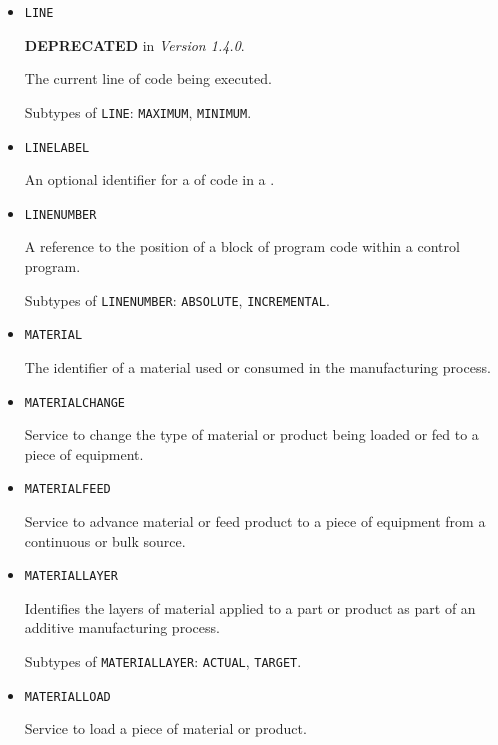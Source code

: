 \begin{itemize}
The software library on a component

Subtypes of \texttt{LIBRARY}: \texttt{VERSION}, \texttt{RELEASE\textunderscore DATE}, \texttt{MANUFACTURER}, \texttt{LICENSE}, \texttt{INSTALL\textunderscore DATE}.

\item \texttt{LINE}  

\textbf{DEPRECATED} in \textit{Version 1.4.0}.

The current line of code being executed.

Subtypes of \texttt{LINE}: \texttt{MAXIMUM}, \texttt{MINIMUM}.

\item \texttt{LINE\textunderscore LABEL}  

An optional identifier for a  of code in a .


\item \texttt{LINE\textunderscore NUMBER}  

A reference to the position of a block of program code within a control program.

Subtypes of \texttt{LINE\textunderscore NUMBER}: \texttt{ABSOLUTE}, \texttt{INCREMENTAL}.

\item \texttt{MATERIAL}  

The identifier of a material used or consumed in the manufacturing process.


\item \texttt{MATERIAL\textunderscore CHANGE}  

Service to change the type of material or product being loaded or fed to a piece of equipment.


\item \texttt{MATERIAL\textunderscore FEED}  

Service to advance material or feed product to a piece of equipment from a continuous or bulk source.


\item \texttt{MATERIAL\textunderscore LAYER}  

Identifies the layers of material applied to a part or product as part of an additive manufacturing process.

Subtypes of \texttt{MATERIAL\textunderscore LAYER}: \texttt{ACTUAL}, \texttt{TARGET}.

\item \texttt{MATERIAL\textunderscore LOAD}  

Service to load a piece of material or product.



\end{itemize}
